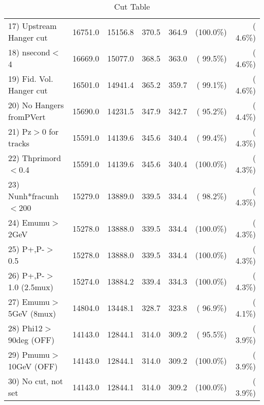 \begin{table}[h!]
\begin{tabular}{||l||r|r|r|r|r|r||}
 17) Upstream Hanger cut  &      16751.0 &      15156.8 &        370.5 &        364.9 & (100.0\%) & (  4.6\%) \\
 18) nsecond$<$4          &      16669.0 &      15077.0 &        368.5 &        363.0 & ( 99.5\%) & (  4.6\%) \\
 19) Fid. Vol. Hanger cut &      16501.0 &      14941.4 &        365.2 &        359.7 & ( 99.1\%) & (  4.6\%) \\
 20) No Hangers fromPVert &      15690.0 &      14231.5 &        347.9 &        342.7 & ( 95.2\%) & (  4.4\%) \\
 21) Pz$>$0 for tracks    &      15591.0 &      14139.6 &        345.6 &        340.4 & ( 99.4\%) & (  4.3\%) \\
 22) Thprimord$<$0.4      &      15591.0 &      14139.6 &        345.6 &        340.4 & (100.0\%) & (  4.3\%) \\
 23) Nunh*fracunh$<$200   &      15279.0 &      13889.0 &        339.5 &        334.4 & ( 98.2\%) & (  4.3\%) \\
 24) Emumu$>$2GeV         &      15278.0 &      13888.0 &        339.5 &        334.4 & (100.0\%) & (  4.3\%) \\
 25) P+,P-$>$0.5          &      15278.0 &      13888.0 &        339.5 &        334.4 & (100.0\%) & (  4.3\%) \\
 26) P+,P-$>$1.0 (2.5mux) &      15274.0 &      13884.2 &        339.4 &        334.3 & (100.0\%) & (  4.3\%) \\
 27) Emumu$>$5GeV  (8mux) &      14804.0 &      13448.1 &        328.7 &        323.8 & ( 96.9\%) & (  4.1\%) \\
 28) Phi12$>$90deg  (OFF) &      14143.0 &      12844.1 &        314.0 &        309.2 & ( 95.5\%) & (  3.9\%) \\
 29) Pmumu$>$10GeV  (OFF) &      14143.0 &      12844.1 &        314.0 &        309.2 & (100.0\%) & (  3.9\%) \\
 30) No cut, not set      &      14143.0 &      12844.1 &        314.0 &        309.2 & (100.0\%) & (  3.9\%) \\
 \hline
 \hline
 \end{tabular}
 \caption{Cut Table           }
 \label{tab-cutcohjpsi-mumu_cohpip}
 \end{table}
